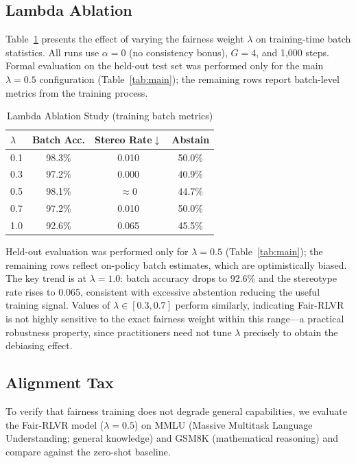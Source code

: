 \documentclass[conference]{IEEEtran}
\begin{document}
\subsection{Lambda Ablation}

Table~\ref{tab:lambda} presents the effect of varying the fairness weight $\lambda$ on training-time batch statistics. All runs use $\alpha = 0$ (no consistency bonus), $G = 4$, and 1,000 steps. Formal evaluation on the held-out test set was performed only for the main $\lambda=0.5$ configuration (Table~\ref{tab:main}); the remaining rows report batch-level metrics from the training process.

\begin{table}[htbp]
\caption{Lambda Ablation Study (training batch metrics)}
\begin{center}
\begin{tabular}{lccc}
\toprule
\textbf{$\lambda$} & \textbf{Batch Acc.} & \textbf{Stereo Rate}$\downarrow$ & \textbf{Abstain} \\
\midrule
0.1 & 98.3\% & 0.010 & 50.0\% \\
0.3 & 97.2\% & 0.000 & 40.9\% \\
0.5 & 98.1\% & $\approx$0 & 44.7\% \\
0.7 & 97.2\% & 0.010 & 50.0\% \\
1.0 & 92.6\% & 0.065 & 45.5\% \\
\bottomrule
\end{tabular}
\label{tab:lambda}
\end{center}
\end{table}

Held-out evaluation was performed only for $\lambda=0.5$ (Table~\ref{tab:main}); the remaining rows reflect on-policy batch estimates, which are optimistically biased. The key trend is at $\lambda=1.0$: batch accuracy drops to 92.6\% and the stereotype rate rises to 0.065, consistent with excessive abstention reducing the useful training signal. Values of $\lambda\in[0.3,0.7]$ perform similarly, indicating Fair-RLVR is not highly sensitive to the exact fairness weight within this range---a practical robustness property, since practitioners need not tune $\lambda$ precisely to obtain the debiasing effect.

\subsection{Alignment Tax}

To verify that fairness training does not degrade general capabilities, we evaluate the Fair-RLVR model ($\lambda = 0.5$) on MMLU (Massive Multitask Language Understanding; general knowledge) and GSM8K (mathematical reasoning) and compare against the zero-shot baseline.
\end{document}
